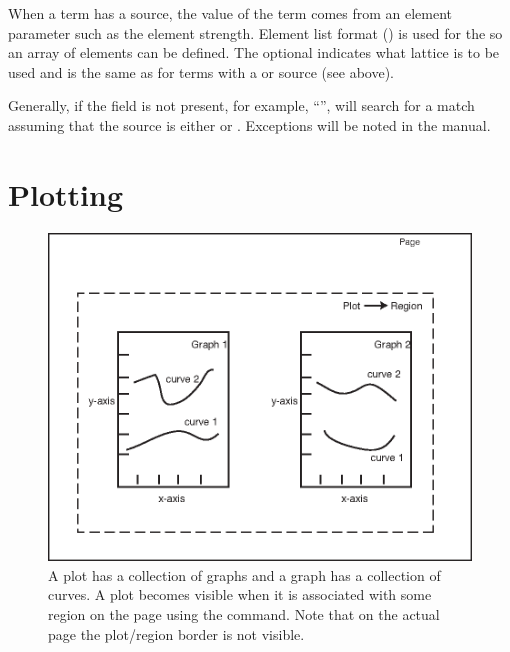When a term has a  source, the value of the term comes from an
element parameter such as the element strength. 
Element list format () is used for the
 so an array of elements can be defined. 
The optional  indicates what lattice 
is to be used and is the same as for terms with a  or  
source (see above).

Generally, if the  field is not present, for example, 
``'', \tao will search 
for a match assuming that the source is either  or . 
Exceptions will be noted in the manual.


\section{Plotting}
\label{s:plotting}

\begin{figure}[tb]
  \centering
  \includegraphics{plot.eps}
  \caption[A plot has a collection of graphs.]
{A plot has a collection of graphs and a graph has a 
collection of curves. A plot becomes visible when it is associated
with some region on the page using the  command. Note that
on the actual page the plot/region border is not visible.}
  \label{f:plot}
\end{figure}

